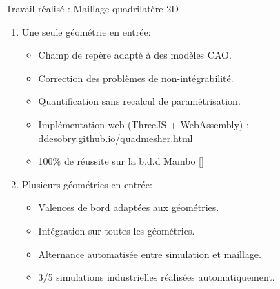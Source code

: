 \begin{frame}{Travail réalisé : Maillage quadrilatère 2D}
    \begin{enumerate}
        \item Une seule géométrie en entrée:
        \begin{itemize}
            \item Champ de repère adapté à des modèles CAO.
            \item Correction des problèmes de non-intégrabilité.
            \item Quantification sans recalcul de paramétrisation.
            \item Implémentation web (ThreeJS + WebAssembly) : \url{ddesobry.github.io/quadmesher.html}
            \item 100\% de réussite sur la b.d.d Mambo [\cite{ledoux_mambo_2019}] 
        \end{itemize}
        \pause
        \item Plusieurs géométries en entrée:
        \begin{itemize}
            \item Valences de bord adaptées aux géométries.
            \item Intégration sur toutes les géométries.
            \item Alternance automatisée entre simulation et maillage. 
            \item 3/5 simulations industrielles réalisées automatiquement. 
        \end{itemize}
    \end{enumerate}
\end{frame}
    
\iffalse
\begin{frame}{Travail réalisé : Maillage hexaédrique 3D}
    \begin{enumerate}
        \item Réparation incrémentale des graphes de singularité
        \item Champ de repère avec singularités de bord imposés.
    \end{enumerate}

    \begin{itemize}
        \item "[\cite{ledoux_mambo_2019}]" / \cite{ray_practical_2016} / \cite{ray_practical_2016} + (1) / \cite{ray_practical_2016} + (2)
        \item "Basique" (74 modèles) / 18\% / 40\% / 69\%
        \item "Simple" (29 modèles) / 0\% / 21\% / 34\%
        \item "Medium" (9 modèles) / 0\% / 0\% / 0\%
    \end{itemize}
\end{frame}
\fi

